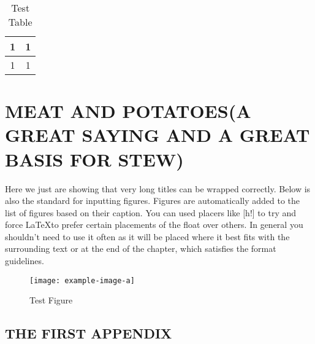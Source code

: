 \begin{body}
\begin{table}[h!]
	\begin{center}
		\begin{tabular}{|c|c|}
			\hline 
			1 & 1 \\ 
			\hline 
			1 & 1 \\ 
			\hline 
		\end{tabular}
	\end{center}
	\caption{Test Table}
	\label{table:test table}
\end{table}
 
\lipsum[1-2]


\chapter{MEAT AND POTATOES(A GREAT SAYING AND A GREAT BASIS FOR STEW)}
Here we just are showing that very long titles can be wrapped correctly. Below is also the standard for inputting figures. Figures are automatically added to the list of figures based on their caption. You can used placers like [h!] to try and force \LaTeX to prefer certain placements of the float over others. In general you shouldn't need to use it often as it will be placed where it best fits with the surrounding text or at the end of the chapter, which satisfies the format guidelines. 

\begin{figure}[h!]
	\begin{center}
		\texttt{[image: example-image-a]}
	\end{center}
	\caption{Test Figure}
	\label{fig:test figure}
\end{figure}

\lipsum[1]


\renewcommand{\bibsection}{\topskip=1in\chapter*{REFERENCES}\topskip=0in \addcontentsline{toc}{chapter}{REFERENCES}}



\begin{appendices}
\renewcommand{\appendixname}{APPENDIX}
\chapter{THE FIRST APPENDIX}
\lipsum[1]
\end{appendices}

\end{body}

